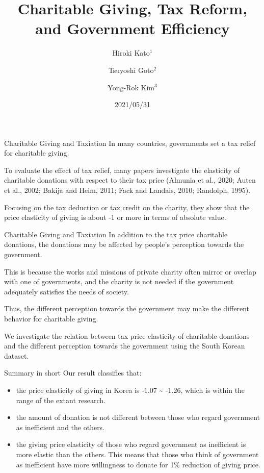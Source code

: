 \documentclass[
  ignorenonframetext,
]{beamer}
\title{Charitable Giving, Tax Reform, and Government Efficiency}
\author{ Hiroki Kato\(^1\)\and Tsuyoshi Goto\(^2\)\and Yong-Rok Kim\(^3\)}
\institute{\(^1\)Osaka University\and\(^2\)Chiba University\and\(^3\)Kobe University}
\date{2021/05/31}
\providecommand{\tightlist}{%
  \setlength{\itemsep}{0pt}\setlength{\parskip}{0pt}}
\begin{document}
\frame{\titlepage}

\begin{frame}
\end{frame}

\begin{frame}{Charitable Giving and Taxiation}
\protect\hypertarget{charitable-giving-and-taxiation}{}
In many countries, governments set a tax relief for charitable giving.

To evaluate the effect of tax relief, many papers investigate the elasticity of charitable donations with respect to their tax price (Almunia et al., 2020; Auten et al., 2002; Bakija and Heim, 2011; Fack and Landais, 2010; Randolph, 1995).

Focusing on the tax deduction or tax credit on the charity, they show that the price elasticity of giving is about -1 or more in terms of absolute value.
\end{frame}

\begin{frame}{Charitable Giving and Taxiation}
\protect\hypertarget{charitable-giving-and-taxiation-1}{}
In addition to the tax price charitable donations, the donations may be affected by people's perception towards the government.

This is because the works and missions of private charity often mirror or overlap with one of governments, and the charity is not needed if the government adequately satisfies the needs of society.

Thus, the different perception towards the government may make the different behavior for charitable giving.

We investigate the relation between tax price elasticity of charitable donations and the different perception towards the government using the South Korean dataset.
\end{frame}

\begin{frame}{Summary in short}
\protect\hypertarget{summary-in-short}{}
Our result classifies that:

\begin{itemize}
\tightlist
\item
  the price elasticity of giving in Korea is -1.07 \textasciitilde{} -1.26, which is within the range of the extant research.
\item
  the amount of donation is not different between those who regard government as inefficient and the others.
\item
  the giving price elasticity of those who regard government as inefficient is more elastic than the others. This means that those who think of government as inefficient have more willingness to donate for 1\% reduction of giving price.
\end{itemize}
\end{frame}
\end{document}
